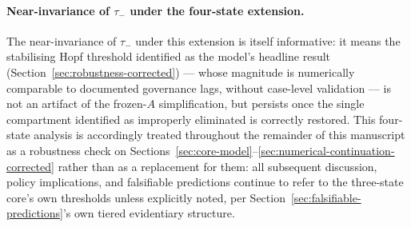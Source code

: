 \documentclass[twocolumn,10pt]{article}
\begin{document}
\paragraph{Near-invariance of $\tau_-$ under the four-state extension.} The near-invariance of $\tau_-$ under this extension is itself informative: it means the stabilising Hopf threshold identified as the model's headline result (Section~\ref{sec:robustness-corrected}) --- whose magnitude is numerically comparable to documented governance lags, without case-level validation --- is not an artifact of the frozen-$A$ simplification, but persists once the single compartment identified as improperly eliminated is correctly restored. This four-state analysis is accordingly treated throughout the remainder of this manuscript as a robustness check on Sections~\ref{sec:core-model}--\ref{sec:numerical-continuation-corrected} rather than as a replacement for them: all subsequent discussion, policy implications, and falsifiable predictions continue to refer to the three-state core's own thresholds unless explicitly noted, per Section~\ref{sec:falsifiable-predictions}'s own tiered evidentiary structure.
\end{document}
